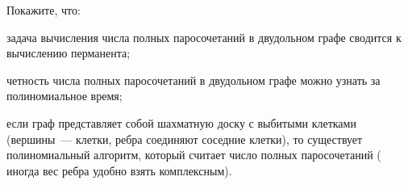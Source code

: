 Покажите, что:
\begin{enumcyr}
    \item задача вычисления числа полных паросочетаний в двудольном графе сводится к вычислению
        перманента;
    \item четность числа полных паросочетаний в двудольном графе можно узнать за полиномиальное время;
    \item если граф представляет собой шахматную доску с выбитыми клетками (вершины~--- клетки, ребра
        соединяют соседние клетки), то существует полиномиальный алгоритм, который считает число полных
        паросочетаний ( иногда вес ребра удобно взять комплексным).
\end{enumcyr}